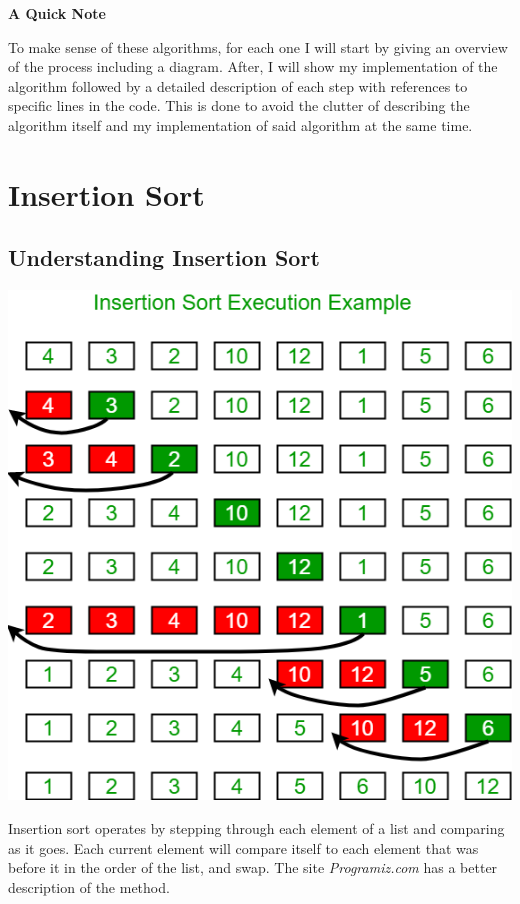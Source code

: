 \documentclass[letterpaper, 10pt]{article}
\begin{document}
\vspace{1.5em}
\begin{center}
\textbf{A Quick Note}
\end{center}

To make sense of these algorithms, for each one I will start by giving an overview of the process including a diagram. After, I will show my implementation of the algorithm followed by a detailed description of each step with references to specific lines in the code. This is done to avoid the clutter of describing the algorithm itself and my implementation of said algorithm at the same time.

\section{Insertion Sort}
\subsection{Understanding Insertion Sort}
\begin{center}
\includegraphics[width=\textwidth / 2]{img/insertionSort.png}
\end{center}
Insertion sort operates by stepping through each element of a list and comparing as it goes. Each current element will compare itself to each element that was before it in the order of the list, and swap. The site \textit{Programiz.com} has a better description of the method.
\end{document}
